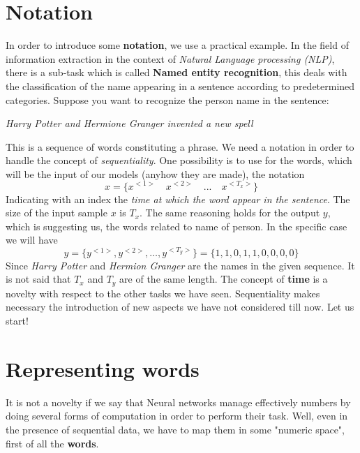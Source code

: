 \section{Notation}
In order to introduce some \textbf{notation}, we use a practical example. In the field of information extraction in the context of \textit{Natural Language processing (NLP)}, there is a sub-task which is called \textbf{Named entity recognition}, this deals with the classification of the name appearing in a sentence according to predetermined categories.
Suppose you want to recognize the person name in the sentence:
\begin{center}
    \textit{Harry Potter and Hermione Granger invented a new spell}
\end{center}
This is a sequence of words constituting a phrase. We need a notation in order to handle the concept of \textit{sequentiality}. One possibility is to use for the words, which will be the input of our models (anyhow they are made), the notation
\begin{equation*}
    x=\{x^{<1>}\quad x^{<2>} \quad ... \quad x^{<T_x>}\}
\end{equation*}  
Indicating with an index the \textit{time at which the word appear in the sentence}. The size of the input sample $x$ is $T_x$. The same reasoning holds for the output $y$, which is suggesting us, the words related to name of person. In the specific case we will have
\begin{equation*}
    y=\{y^{<1>}, y^{<2>}, \dots, y^{<T_y>}\} = \{1,1,0,1,1,0,0,0,0\}
\end{equation*}
Since \textit{Harry Potter} and \textit{Hermion Granger} are the names in the given sequence. It is not said that $T_x$ and $T_y$ are of the same length. The concept of \textbf{time} is a novelty with respect to the other tasks we have seen. Sequentiality makes necessary the introduction of new aspects we have not considered till now. Let us start!

\section{Representing words}
It is not a novelty if we say that Neural networks manage effectively numbers by doing several forms of computation in order to perform their task. Well, even in the presence of sequential data, we have to map them in some "numeric space", first of all the \textbf{words}. \\


